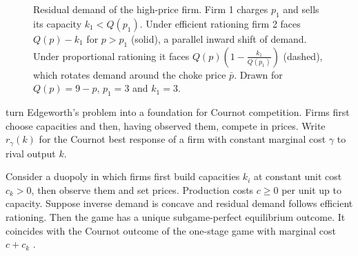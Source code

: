 \begin{figure}[htbp]
\centering
{}
\caption{Residual demand of the high-price firm. Firm 1 charges $p_1$ and sells its capacity $k_1 < Q(p_1)$. Under
efficient rationing firm 2 faces $Q(p) - k_1$ for $p > p_1$ (solid), a parallel inward shift of demand. Under
proportional rationing it faces $Q(p)\left(1 - \frac{k_1}{Q(p_1)}\right)$ (dashed), which rotates demand around the
choke price $\bar p$. Drawn for $Q(p) = 9 - p$, $p_1 = 3$ and $k_1 = 3$.}
\label{fig:02-rationing}
\end{figure}

\citet{KrepsScheinkman1983} turn Edgeworth's problem into a foundation for Cournot competition. Firms first choose
capacities and then, having observed them, compete in prices. Write $r_\gamma(k)$ for the Cournot best response of a
firm with constant marginal cost $\gamma$ to rival output $k$.

\begin{proposition}\label{prop:02-ks}
Consider a duopoly in which firms first build capacities $k_i$ at constant unit cost $c_k > 0$, then observe them
and set prices. Production costs $c \ge 0$ per unit up to capacity. Suppose inverse demand is concave and residual
demand follows efficient rationing. Then the game has a unique subgame-perfect equilibrium outcome. It coincides with
the Cournot outcome of the one-stage game with marginal cost $c + c_k$ \citep{KrepsScheinkman1983}.
\end{proposition}

